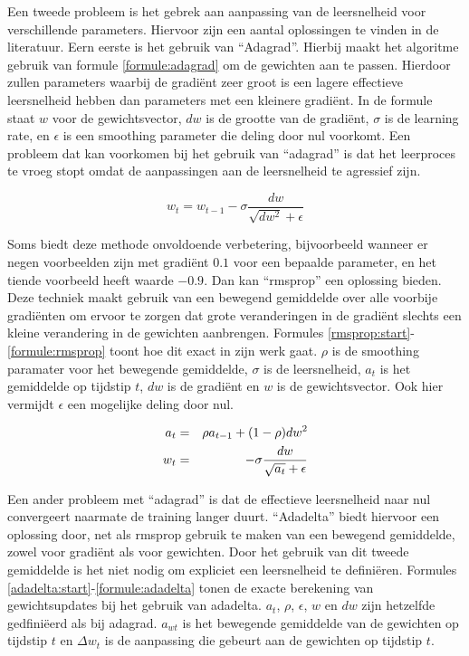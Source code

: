 Een tweede probleem is het gebrek aan aanpassing van de leersnelheid voor verschillende parameters. Hiervoor zijn een aantal oplossingen te vinden in de literatuur. Eern eerste is het gebruik van ``Adagrad''\cite{Duchi2011}. Hierbij maakt het algoritme gebruik van formule \eqref{formule:adagrad} om de gewichten aan te passen. Hierdoor zullen parameters waarbij de gradi\"ent zeer groot is een lagere effectieve leersnelheid hebben dan parameters met een kleinere gradi\"ent. In de formule staat $w$ voor de gewichtsvector, $dw$ is de grootte van de gradi\"ent, $\sigma$ is de learning rate, en $\epsilon$ is een smoothing parameter die deling door nul voorkomt. Een probleem dat kan voorkomen bij het gebruik van ``adagrad'' is dat het leerproces te vroeg stopt omdat de aanpassingen aan de leersnelheid te agressief zijn.
 
\begin{equation}
    w_t = w_{t-1} - \sigma \frac{dw}{\sqrt{dw^2} + \epsilon}
    \label{formule:adagrad}
\end{equation}

Soms biedt deze methode onvoldoende verbetering, bijvoorbeeld wanneer er negen voorbeelden zijn met gradi\"ent $0.1$ voor een bepaalde parameter, en het tiende voorbeeld heeft waarde $-0.9$. Dan kan ``rmsprop''\cite{RMSprop} een oplossing bieden. Deze techniek maakt gebruik van een bewegend gemiddelde over alle voorbije gradi\"enten om ervoor te zorgen dat grote veranderingen in de gradi\"ent slechts een kleine verandering in de gewichten aanbrengen. Formules \eqref{rmsprop:start}-\eqref{formule:rmsprop} toont hoe dit exact in zijn werk gaat. $\rho$ is de smoothing paramater voor het bewegende gemiddelde, $\sigma$ is de leersnelheid, $a_t$ is het gemiddelde op tijdstip $t$, $dw$ is de gradi\"ent en $w$ is de gewichtsvector. Ook hier vermijdt $\epsilon$ een mogelijke deling door nul.

\begin{eqnarray}
\vspace{-3mm}
    \label{rmsprop:start}
    a_t & = & \rho  a_{t-1} + (1 - \rho)dw^2 \\
    w_t & = &  - \sigma \frac{dw}{\sqrt{a_t} + \epsilon}
    \label{formule:rmsprop}
    \vspace{-3mm}
\end{eqnarray}

Een ander probleem met ``adagrad'' is dat de effectieve leersnelheid naar nul convergeert naarmate de training langer duurt. ``Adadelta''\cite{Zeiler2012} biedt hiervoor een oplossing door, net als rmsprop gebruik te maken van een bewegend gemiddelde, zowel voor gradi\"ent als voor gewichten. Door het gebruik van dit tweede gemiddelde is het niet nodig om expliciet een leersnelheid te defini\"eren. Formules \eqref{adadelta:start}-\eqref{formule:adadelta} tonen de exacte berekening van gewichtsupdates bij het gebruik van adadelta. $a_t$, $\rho$, $\epsilon$, $w$ en $dw$ zijn hetzelfde gedfini\"eerd als bij adagrad. $a_{wt}$ is het bewegende gemiddelde van de gewichten op tijdstip $t$ en $\Delta w_t$ is de aanpassing die gebeurt aan de gewichten op tijdstip $t$.


